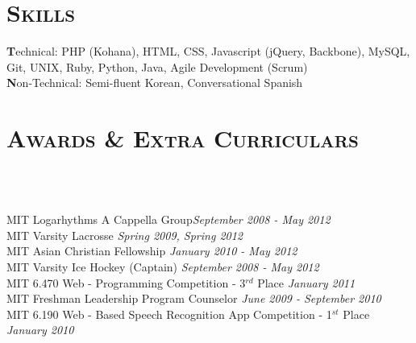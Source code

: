 \begin{resume}
%

\section{\textsc{Skills}}

\textbf Technical: PHP (Kohana), HTML, CSS, Javascript (jQuery, Backbone), MySQL, Git, UNIX, Ruby, Python, Java, Agile Development (Scrum)\\
\textbf Non-Technical: Semi-fluent Korean, Conversational Spanish

\section{\textsc{Awards \& Extra Curriculars}}

\begin{formatb}
  \\
  \body\\
\end{formatb}
MIT Logarhythms A Cappella Group\hfill{\em{September 2008 - May 2012}}\\
MIT Varsity Lacrosse \hfill{\em{Spring 2009, Spring 2012}}\\
MIT Asian Christian Fellowship \hfill{\em{January 2010 - May 2012}}\\
MIT Varsity Ice Hockey (Captain) \hfill{\em{September 2008 - May 2012}}\\
MIT 6.470 Web - Programming Competition - 3$^{rd}$ Place \hfill{\em{January 2011}}\\
MIT Freshman Leadership Program Counselor \hfill{\em{June 2009 - September 2010}}\\
MIT 6.190 Web - Based Speech Recognition App Competition - 1$^{st}$ Place \hfill{\em{January 2010}}\\




\end{resume}
